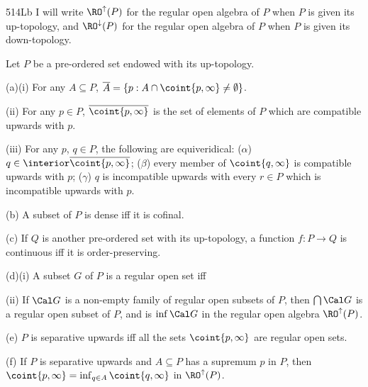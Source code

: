 \spheader 514Lb I will write $\RO^{\uparrow}(P)$ for the regular open
algebra of $P$ when $P$ is given its up-topology, and
$\RO^{\downarrow}(P)$ for the regular open
algebra of $P$ when $P$ is given its down-topology.

 Let $P$ be a pre-ordered set endowed with
its up-topology.

(a)(i) For any $A\subseteq P$,
$\overline{A}=\{p:A\cap\coint{p,\infty}\ne\emptyset\}$.

\quad(ii) For any $p\in P$, $\overline{\coint{p,\infty}}$ is the set of
elements of $P$ which are compatible upwards with $p$.

\quad(iii) For any $p$, $q\in P$, the following are equiveridical:
($\alpha$) $q\in\interior\overline{\coint{p,\infty}}$;  ($\beta$) every
member of $\coint{q,\infty}$ is compatible upwards with $p$;  ($\gamma$)
$q$ is incompatible upwards with every $r\in P$ which is incompatible
upwards with $p$.

(b) A subset of $P$ is dense iff it is cofinal.

(c) If $Q$ is another pre-ordered set with its up-topology,
a function $f:P\to Q$ is continuous iff it is order-preserving.

(d)(i) A subset $G$ of $P$ is a regular open set iff


\quad(ii) If $\Cal G$ is a
non-empty family of regular open subsets of
$P$, then $\bigcap\Cal G$ is a regular open subset of $P$, and is
$\inf\Cal G$ in the regular open algebra $\RO^{\uparrow}(P)$.

(e) $P$ is separative upwards iff all the sets $\coint{p,\infty}$ are
regular open sets.

(f) If $P$ is separative upwards and $A\subseteq P$ has a supremum $p$ in
$P$, then $\coint{p,\infty}=\inf_{q\in A}\coint{q,\infty}$ in
$\RO^{\uparrow}(P)$.

